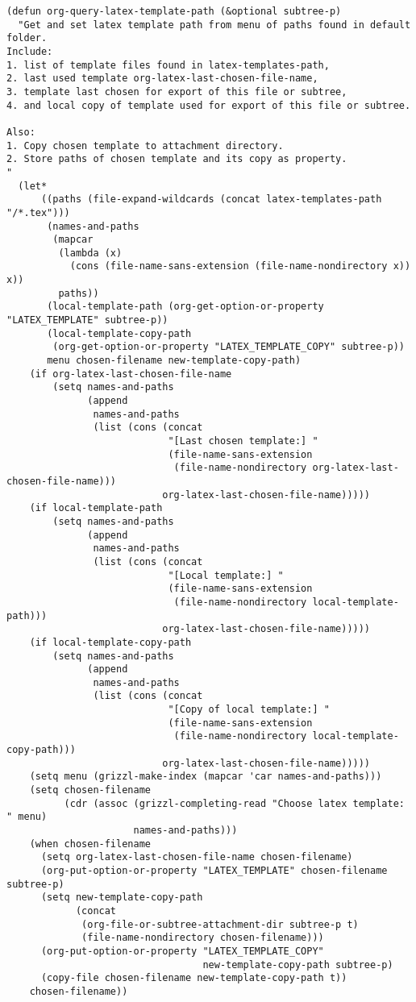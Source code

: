 \documentclass[nofonts]{tufte-handout}
\begin{document}
\begin{enumerate}
\begin{enumerate}
\begin{verbatim}
(defun org-query-latex-template-path (&optional subtree-p)
  "Get and set latex template path from menu of paths found in default folder.
Include:
1. list of template files found in latex-templates-path,
2. last used template org-latex-last-chosen-file-name,
3. template last chosen for export of this file or subtree,
4. and local copy of template used for export of this file or subtree.

Also:
1. Copy chosen template to attachment directory.
2. Store paths of chosen template and its copy as property.
"
  (let*
      ((paths (file-expand-wildcards (concat latex-templates-path "/*.tex")))
       (names-and-paths
        (mapcar
         (lambda (x)
           (cons (file-name-sans-extension (file-name-nondirectory x)) x))
         paths))
       (local-template-path (org-get-option-or-property "LATEX_TEMPLATE" subtree-p))
       (local-template-copy-path
        (org-get-option-or-property "LATEX_TEMPLATE_COPY" subtree-p))
       menu chosen-filename new-template-copy-path)
    (if org-latex-last-chosen-file-name
        (setq names-and-paths
              (append
               names-and-paths
               (list (cons (concat
                            "[Last chosen template:] "
                            (file-name-sans-extension
                             (file-name-nondirectory org-latex-last-chosen-file-name)))
                           org-latex-last-chosen-file-name)))))
    (if local-template-path
        (setq names-and-paths
              (append
               names-and-paths
               (list (cons (concat
                            "[Local template:] "
                            (file-name-sans-extension
                             (file-name-nondirectory local-template-path)))
                           org-latex-last-chosen-file-name)))))
    (if local-template-copy-path
        (setq names-and-paths
              (append
               names-and-paths
               (list (cons (concat
                            "[Copy of local template:] "
                            (file-name-sans-extension
                             (file-name-nondirectory local-template-copy-path)))
                           org-latex-last-chosen-file-name)))))
    (setq menu (grizzl-make-index (mapcar 'car names-and-paths)))
    (setq chosen-filename
          (cdr (assoc (grizzl-completing-read "Choose latex template: " menu)
                      names-and-paths)))
    (when chosen-filename
      (setq org-latex-last-chosen-file-name chosen-filename)
      (org-put-option-or-property "LATEX_TEMPLATE" chosen-filename subtree-p)
      (setq new-template-copy-path
            (concat
             (org-file-or-subtree-attachment-dir subtree-p t)
             (file-name-nondirectory chosen-filename)))
      (org-put-option-or-property "LATEX_TEMPLATE_COPY"
                                  new-template-copy-path subtree-p)
      (copy-file chosen-filename new-template-copy-path t))
    chosen-filename))


\end{verbatim}
\end{enumerate}
\end{enumerate}
\end{document}

